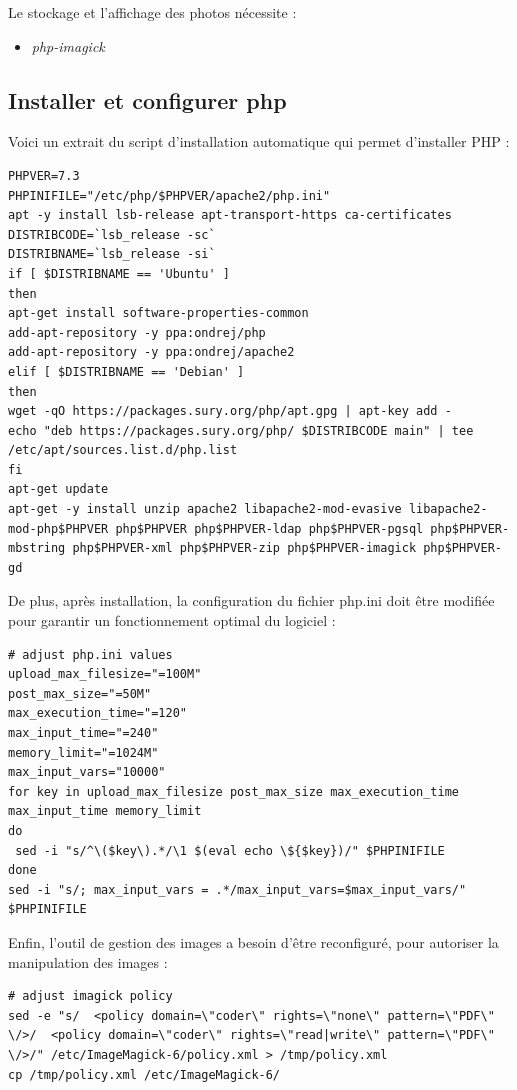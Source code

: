 Le stockage et l'affichage des photos nécessite :
\begin{itemize}
\item \textit{php-imagick}
\end{itemize}

\subsection{Installer et configurer php}
Voici un extrait du script d'installation automatique qui permet d'installer PHP :
\begin{lstlisting}
PHPVER=7.3
PHPINIFILE="/etc/php/$PHPVER/apache2/php.ini"
apt -y install lsb-release apt-transport-https ca-certificates
DISTRIBCODE=`lsb_release -sc`
DISTRIBNAME=`lsb_release -si`
if [ $DISTRIBNAME == 'Ubuntu' ]
then
apt-get install software-properties-common
add-apt-repository -y ppa:ondrej/php
add-apt-repository -y ppa:ondrej/apache2
elif [ $DISTRIBNAME == 'Debian' ]
then
wget -qO https://packages.sury.org/php/apt.gpg | apt-key add -
echo "deb https://packages.sury.org/php/ $DISTRIBCODE main" | tee /etc/apt/sources.list.d/php.list
fi
apt-get update
apt-get -y install unzip apache2 libapache2-mod-evasive libapache2-mod-php$PHPVER php$PHPVER php$PHPVER-ldap php$PHPVER-pgsql php$PHPVER-mbstring php$PHPVER-xml php$PHPVER-zip php$PHPVER-imagick php$PHPVER-gd
\end{lstlisting}

De plus, après installation, la configuration du fichier php.ini doit être modifiée pour garantir un fonctionnement optimal du logiciel :
\begin{lstlisting}
# adjust php.ini values
upload_max_filesize="=100M"
post_max_size="=50M"
max_execution_time="=120"
max_input_time="=240"
memory_limit="=1024M"
max_input_vars="10000"
for key in upload_max_filesize post_max_size max_execution_time max_input_time memory_limit
do
 sed -i "s/^\($key\).*/\1 $(eval echo \${$key})/" $PHPINIFILE
done
sed -i "s/; max_input_vars = .*/max_input_vars=$max_input_vars/" $PHPINIFILE
\end{lstlisting}

Enfin, l'outil de gestion des images a besoin d'être reconfiguré, pour autoriser la manipulation des images :
\begin{lstlisting}
# adjust imagick policy
sed -e "s/  <policy domain=\"coder\" rights=\"none\" pattern=\"PDF\" \/>/  <policy domain=\"coder\" rights=\"read|write\" pattern=\"PDF\" \/>/" /etc/ImageMagick-6/policy.xml > /tmp/policy.xml
cp /tmp/policy.xml /etc/ImageMagick-6/
\end{lstlisting}

